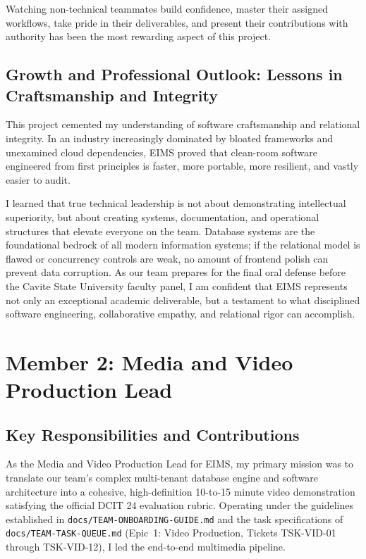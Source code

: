 Watching non-technical teammates build confidence, master their assigned workflows, take pride in their deliverables, and present their contributions with authority has been the most rewarding aspect of this project.

\subsection{Growth and Professional Outlook: Lessons in Craftsmanship and Integrity}
This project cemented my understanding of software craftsmanship and relational integrity. In an industry increasingly dominated by bloated frameworks and unexamined cloud dependencies, EIMS proved that clean-room software engineered from first principles is faster, more portable, more resilient, and vastly easier to audit.

I learned that true technical leadership is not about demonstrating intellectual superiority, but about creating systems, documentation, and operational structures that elevate everyone on the team. Database systems are the foundational bedrock of all modern information systems; if the relational model is flawed or concurrency controls are weak, no amount of frontend polish can prevent data corruption. As our team prepares for the final oral defense before the Cavite State University faculty panel, I am confident that EIMS represents not only an exceptional academic deliverable, but a testament to what disciplined software engineering, collaborative empathy, and relational rigor can accomplish.

\newpage
\section{Member 2: Media and Video Production Lead}
\label{sec:reflection_member_2}

\subsection{Key Responsibilities and Contributions}
As the Media and Video Production Lead for EIMS, my primary mission was to translate our team's complex multi-tenant database engine and software architecture into a cohesive, high-definition 10-to-15 minute video demonstration satisfying the official DCIT 24 evaluation rubric. Operating under the guidelines established in \texttt{docs/TEAM-ONBOARDING-GUIDE.md} and the task specifications of \texttt{docs/TEAM-TASK-QUEUE.md} (Epic~1: Video Production, Tickets TSK-VID-01 through TSK-VID-12), I led the end-to-end multimedia pipeline.

